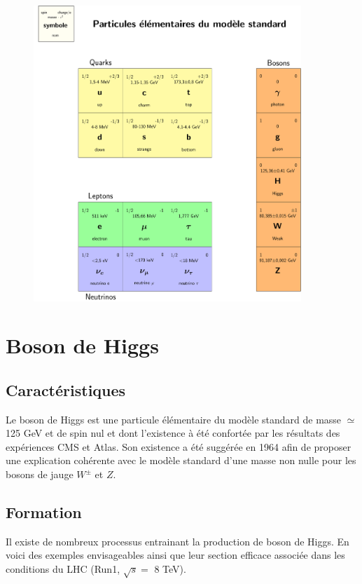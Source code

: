 \documentclass[11pt]{article} %
\begin{document}
\begin{figure}[H]
\centering
  \caption{ }
\includegraphics[width=0.9\textwidth]{table_ms.pdf}

\end{figure}

\section{Boson de Higgs}

\subsection{Caractéristiques}

Le boson de Higgs est une particule élémentaire du modèle standard de masse $\simeq$ 125 GeV et de spin nul et dont l'existence à été confortée par les résultats des expériences CMS et Atlas.
Son existence a été suggérée en 1964 afin de proposer une explication cohérente avec le modèle standard d'une masse non nulle pour les bosons de jauge $W^{\pm}$ et $Z$.

\subsection{Formation}

Il existe de nombreux processus entrainant la production de boson de Higgs. En voici des exemples envisageables ainsi que leur section efficace associée dans les conditions du LHC (Run1, $\sqrt{s} = $ 8 TeV).
\end{document}
